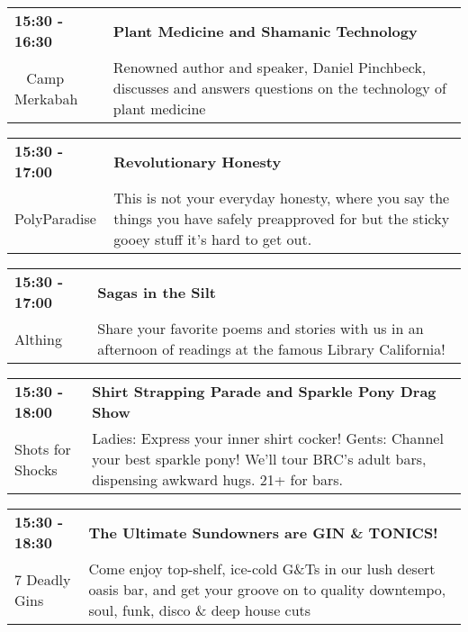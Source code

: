 \begin{tabular}{ p{1in} p{2.2in} }
    \textbf{15:30 - 16:30} & \textbf{Plant Medicine and Shamanic Technology} \\
    ~ \newline Camp Merkabah & Renowned author and speaker, Daniel Pinchbeck, discusses and answers questions on the technology of plant medicine \\
    \hline 
\end{tabular}
    
\begin{tabular}{ p{1in} p{2.2in} }
    \textbf{15:30 - 17:00} & \textbf{Revolutionary Honesty } \\
    PolyParadise \newline  & This is not your everyday honesty, where you say the things you have safely preapproved for but the sticky gooey stuff it's hard to get out. \\
    \hline 
\end{tabular}
    
\begin{tabular}{ p{1in} p{2.2in} }
    \textbf{15:30 - 17:00} & \textbf{Sagas in the Silt} \\
    Althing \newline  & Share your favorite poems and stories with us in an afternoon of readings at the famous Library California! \\
    \hline 
\end{tabular}
    
\begin{tabular}{ p{1in} p{2.2in} }
    \textbf{15:30 - 18:00} & \textbf{Shirt Strapping Parade and Sparkle Pony Drag Show} \\
    Shots for Shocks \newline  & Ladies: Express your inner shirt cocker! Gents: Channel your best sparkle pony! We'll tour BRC's adult bars, dispensing awkward hugs. 21+ for bars. \\
    \hline 
\end{tabular}
    
\begin{tabular}{ p{1in} p{2.2in} }
    \textbf{15:30 - 18:30} & \textbf{The Ultimate Sundowners are GIN \& TONICS!} \\
    7 Deadly Gins \newline  & Come enjoy top-shelf, ice-cold G\&Ts in our lush desert oasis bar, and get your groove on to quality downtempo, soul, funk, disco \& deep house cuts \\
    \hline 
\end{tabular}
    
